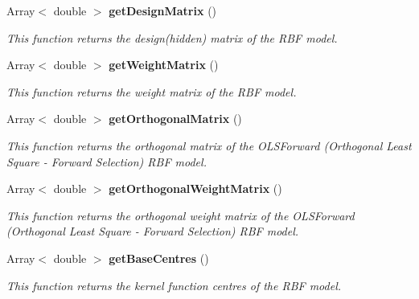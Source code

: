 \begin{CompactItemize}
\item 
Array$<$ double $>$ {\bf get\-Design\-Matrix} ()
\begin{CompactList}\small\item\em This function returns the design(hidden) matrix of the RBF model. \item\end{CompactList}\item 
Array$<$ double $>$ {\bf get\-Weight\-Matrix} ()
\begin{CompactList}\small\item\em This function returns the weight matrix of the RBF model. \item\end{CompactList}\item 
Array$<$ double $>$ {\bf get\-Orthogonal\-Matrix} ()
\begin{CompactList}\small\item\em This function returns the orthogonal matrix of the OLSForward (Orthogonal Least Square - Forward Selection) RBF model. \item\end{CompactList}\item 
Array$<$ double $>$ {\bf get\-Orthogonal\-Weight\-Matrix} ()
\begin{CompactList}\small\item\em This function returns the orthogonal weight matrix of the OLSForward (Orthogonal Least Square - Forward Selection) RBF model. \item\end{CompactList}\item 
Array$<$ double $>$ {\bf get\-Base\-Centres} ()
\begin{CompactList}\small\item\em This function returns the kernel function centres of the RBF model. \item\end{CompactList}\end{CompactItemize}
